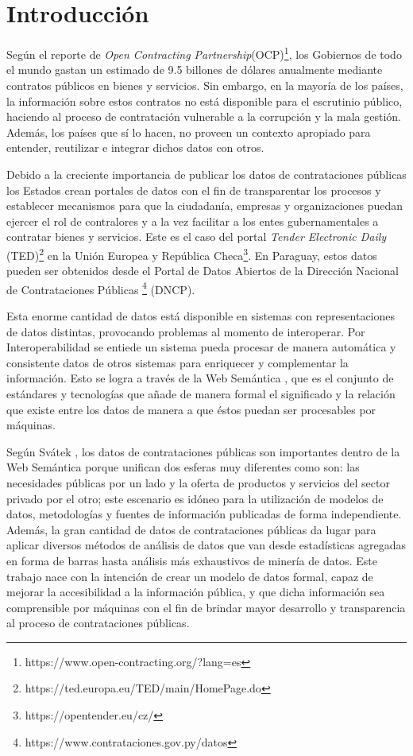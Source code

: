 \chapter{Introducción}
\label{chap:introduccion}




Según el reporte de \textit{Open Contracting Partnership}(OCP)\footnote{https://www.open-contracting.org/?lang=es}, los Gobiernos de todo el mundo gastan un estimado de 9.5 billones de dólares anualmente mediante contratos públicos en bienes y servicios. Sin embargo, en la mayoría de los países, la información sobre estos contratos no está disponible para el escrutinio público, haciendo al proceso de contratación vulnerable a la corrupción y la mala gestión. Además, los países que sí lo hacen, no proveen un contexto apropiado para entender, reutilizar e integrar dichos datos con otros.

Debido a la creciente importancia de publicar los datos de contrataciones públicas los Estados crean portales de datos con el fin de transparentar los procesos y establecer mecanismos para que la ciudadanía, empresas y organizaciones puedan ejercer el rol de contralores y a la vez facilitar a los entes gubernamentales a contratar bienes y servicios. Este es el caso del portal \textit{Tender Electronic Daily} (TED)\footnote{https://ted.europa.eu/TED/main/HomePage.do}  en la Unión Europea y República Checa\footnote{https://opentender.eu/cz/}. En Paraguay, estos datos pueden ser obtenidos desde el Portal de Datos Abiertos de la Dirección Nacional de Contrataciones Públicas \footnote{https://www.contrataciones.gov.py/datos} (DNCP).

Esta enorme cantidad de datos está disponible en sistemas con representaciones de datos distintas, provocando problemas al momento de interoperar. Por Interoperabilidad se entiede un sistema pueda procesar de manera automática y consistente datos de otros sistemas para enriquecer y complementar la información. Esto se logra a través de la Web Semántica \cite{Semantic20:online}, que es el conjunto de estándares y tecnologías que añade de manera formal el significado y la relación que existe entre los datos de manera a que éstos puedan ser procesables por máquinas.

Según Svátek \cite{svatek2014linked}, los datos de contrataciones públicas son importantes dentro de la Web Semántica \cite{Semantic20:online} porque unifican dos esferas muy diferentes como son: las necesidades públicas por un lado y la oferta de productos y servicios del sector privado por el otro; este escenario es idóneo para la utilización de modelos de datos, metodologías y fuentes de información publicadas de forma independiente. Además, la gran cantidad de datos de contrataciones públicas da lugar para aplicar diversos métodos de análisis de datos que van desde estadísticas agregadas en forma de barras hasta análisis más exhaustivos de minería de datos.
Este trabajo nace con la intención de crear un modelo de datos formal, capaz de mejorar la accesibilidad a la información pública, y que dicha información sea comprensible por máquinas con el fin de brindar mayor desarrollo y transparencia al proceso de contrataciones públicas. 


